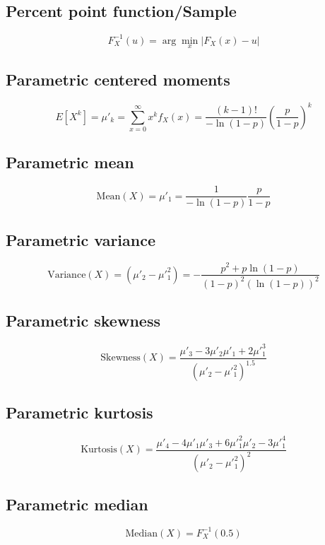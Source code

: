 \documentclass{article}
\begin{document}
\subsection{Percent point function/Sample}
\begin{equation*} F^{-1}_{X}\left(u\right)=\arg\min_{x}\left| F_{X}\left(x\right)-u \right| \end{equation*}
\subsection{Parametric centered moments}
\begin{equation*} E[X^k]=\mu'_{k}=\sum_{x=0}^{\infty}x^{k}f_{X}\left(x\right)=\frac{(k - 1)!}{-\ln(1 - p)} \left(\frac{p}{1 - p}\right)^k \end{equation*}
\subsection{Parametric mean}
\begin{equation*} \mathrm{Mean}(X)=\mu'_{1}=\frac{1}{-\ln(1 - p)} \frac{p}{1 - p} \end{equation*}
\subsection{Parametric variance}
\begin{equation*} \mathrm{Variance}(X)=(\mu'_{2}-\mu'^{2}_{1})=-\frac{p^2 + p\ln(1-p)}{(1-p)^2(\ln(1-p))^2} \end{equation*}
\subsection{Parametric skewness}
\begin{equation*} \mathrm{Skewness}(X)=\frac{\mu'_{3}-3\mu'_{2}\mu'_{1}+2\mu'^{3}_{1}}{(\mu'_{2}-\mu'^{2}_{1})^{1.5}} \end{equation*}
\subsection{Parametric kurtosis}
\begin{equation*} \mathrm{Kurtosis}(X)=\frac{\mu'_{4}-4\mu'_{1}\mu'_{3}+6\mu'^{2}_{1}\mu'_{2}-3\mu'^{4}_{1}}{(\mu'_{2}-\mu'^{2}_{1})^{2}} \end{equation*}
\subsection{Parametric median}
\begin{equation*} \mathrm{Median}(X)=F^{-1}_{X}\left(0.5\right) \end{equation*}
\end{document}
